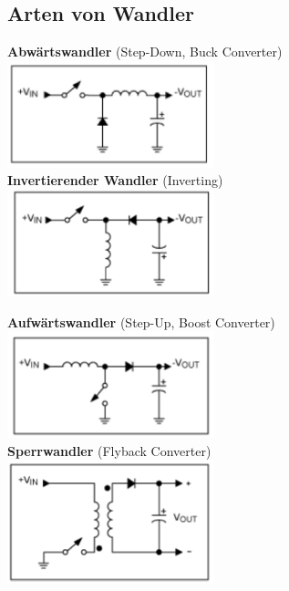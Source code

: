 \subsection{Arten von Wandler}
		\begin{minipage}{8cm}
			\textbf{Abwärtswandler} (Step-Down, Buck Converter) \\
			\includegraphics[width=6cm]{images/schaltregler/01_buckConv} \\
			\textbf{Invertierender Wandler} (Inverting) \\
			\includegraphics[width=6cm]{images/schaltregler/02_invConv} \\
		\end{minipage}
		\begin{minipage}{8cm}
			\textbf{Aufwärtswandler} (Step-Up, Boost Converter) \\
			\includegraphics[width=6cm]{images/schaltregler/03_boostConv} \\
			\textbf{Sperrwandler} (Flyback Converter) \\
			\includegraphics[width=6cm]{images/schaltregler/04_flybackConv}
		\end{minipage}


